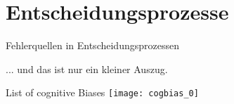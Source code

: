 \section{Entscheidungsprozesse}

\begin{frame}[c]{Fehlerquellen in Entscheidungsprozessen}
    \centering
    \only<1>{\texttt{[image: DecisionMakingProcedure]}}
\end{frame}


\begin{frame}[standout]
    ... und das ist nur ein kleiner Auszug.
\end{frame}

\begin{frame}[c]{List of cognitive Biases}
    \centering
    \texttt{[image: cogbias\_0]}
\end{frame}


